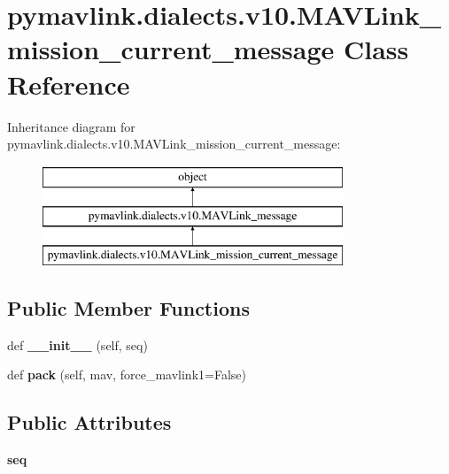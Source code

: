 \hypertarget{classpymavlink_1_1dialects_1_1v10_1_1MAVLink__mission__current__message}{}\section{pymavlink.\+dialects.\+v10.\+M\+A\+V\+Link\+\_\+mission\+\_\+current\+\_\+message Class Reference}
\label{classpymavlink_1_1dialects_1_1v10_1_1MAVLink__mission__current__message}
Inheritance diagram for pymavlink.\+dialects.\+v10.\+M\+A\+V\+Link\+\_\+mission\+\_\+current\+\_\+message\+:\begin{figure}[H]
\begin{center}
\leavevmode
\includegraphics[height=3.000000cm]{classpymavlink_1_1dialects_1_1v10_1_1MAVLink__mission__current__message}
\end{center}
\end{figure}
\subsection*{Public Member Functions}
\begin{DoxyCompactItemize}
\item 
\mbox{\label{classpymavlink_1_1dialects_1_1v10_1_1MAVLink__mission__current__message_a6f5df9d30df1c06553ca14111d41648f}} 
def {\bfseries \+\_\+\+\_\+init\+\_\+\+\_\+} (self, seq)
\item 
\mbox{\label{classpymavlink_1_1dialects_1_1v10_1_1MAVLink__mission__current__message_a07045f0ded73875767e1bb782db5ad06}} 
def {\bfseries pack} (self, mav, force\+\_\+mavlink1=False)
\end{DoxyCompactItemize}
\subsection*{Public Attributes}
\begin{DoxyCompactItemize}
\item 
\mbox{\label{classpymavlink_1_1dialects_1_1v10_1_1MAVLink__mission__current__message_ab703add5dcab36b297e7cabd0ffcc6ce}} 
{\bfseries seq}
\end{DoxyCompactItemize}
